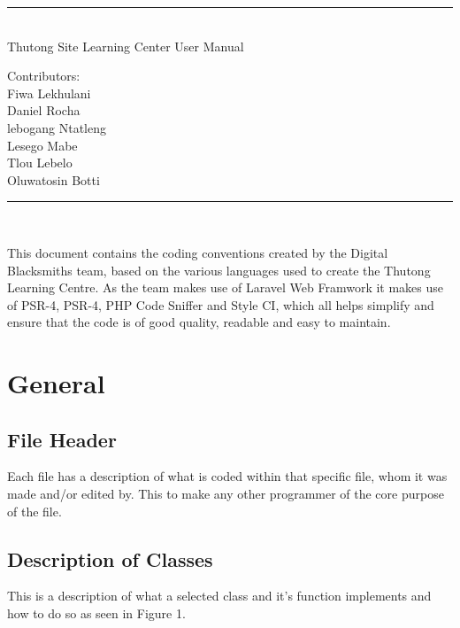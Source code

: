 \documentclass[12pt,a4paper]{article}
\begin{document}
	\begin{titlepage}
		\centering
		\vspace*{\fill}
		
		\vspace*{0.5cm}
		
		\huge\bfseries
		\rule{\textwidth}{1.6pt}\\[\baselineskip]
		Thutong Site Learning Center User Manual
		
		\vspace*{0.5cm}
		
		\large Contributors: \\[\baselineskip]
		
			{Fiwa Lekhulani\\Daniel Rocha\\lebogang Ntatleng\\Lesego Mabe\\Tlou Lebelo\\Oluwatosin Botti}
		
		\rule{\textwidth}{1.6pt}\\[\baselineskip]
		
		
		\vspace*{\fill}
	\end{titlepage}


	\date{\textbf{\today}}
	\pagebreak
	\tableofcontents
	\newpage


	This document contains the coding conventions created by the Digital Blacksmiths team, based on the various languages used to create the Thutong Learning Centre.
	\newline
	As the team makes use of Laravel Web Framwork it makes use of PSR-4, PSR-4, PHP Code Sniffer and Style CI, which all helps simplify and ensure that the code is of good quality, readable and easy to maintain.
	
	\section{General}
	
	\subsection{File Header}
	Each file has a description of what is coded within that specific file, whom it was made and/or edited by. This to make any other programmer of the core purpose of the file.
	
	
	\subsection{Description of Classes}
	This is a description of what a selected class and it's function implements and how to do so as seen in Figure 1.
	
\end{document}
